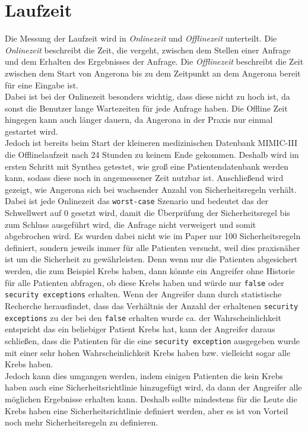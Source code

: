 \documentclass[german,version-2020-11]{uzl-thesis}
\begin{document}
\section{Laufzeit}
Die Messung der Laufzeit wird in \textit{Onlinezeit} und \textit{Offlinezeit} unterteilt. Die \textit{Onlinezeit} beschreibt die Zeit, die vergeht, zwischen dem Stellen einer Anfrage und dem Erhalten des Ergebnisses der Anfrage. Die \textit{Offlinezeit}  beschreibt die Zeit zwischen dem Start von Angerona bis zu dem Zeitpunkt an dem Angerona bereit für eine Eingabe ist. \\ 
Dabei ist bei der Onlinezeit besonders wichtig, dass diese nicht zu hoch ist, da sonst die Benutzer lange Wartezeiten  für jede Anfrage haben. Die Offline Zeit hingegen kann auch länger dauern, da Angerona in der Praxis nur einmal gestartet wird.  \\
Jedoch ist bereits beim Start der kleineren medizinischen Datenbank MIMIC-III die Offlinelaufzeit nach 24 Stunden zu keinem Ende gekommen. Deshalb wird im ersten Schritt mit Synthea getestet, wie groß eine Patientendatenbank werden kann, sodass diese noch in angemessener Zeit nutzbar ist.   
Anschließend wird gezeigt, wie Angerona sich bei wachsender Anzahl von Sicherheitsregeln verhält.\\ 
Dabei ist jede Onlinezeit das \texttt{worst-case} Szenario und bedeutet das der Schwellwert auf 0 gesetzt wird, damit die Überprüfung der Sicherheitsregel bis zum Schluss ausgeführt wird, die Anfrage nicht verweigert und somit abgebrochen wird. Es wurden dabei nicht wie im Paper nur 100 Sicherheitsregeln definiert, sondern jeweils immer für alle Patienten versucht, weil dies praxisnäher ist um die Sicherheit zu gewährleisten. Denn wenn nur die Patienten abgesichert werden, die zum Beispiel Krebs haben, dann könnte ein Angreifer ohne Historie für alle Patienten abfragen, ob diese Krebs haben und würde nur \texttt{false} oder \texttt{security exceptions} erhalten. Wenn der Angreifer dann durch statistische Recherche herausfindet, dass das Verhältnis der Anzahl der erhaltenen \texttt{security exceptions} zu der bei den \texttt{false} erhalten wurde ca. der Wahrscheinlichkeit entspricht das ein beliebiger Patient Krebs hat, kann der Angreifer daraus schließen, dass die Patienten für die eine \texttt{security exception} ausgegeben wurde mit einer sehr hohen Wahrscheinlichkeit Krebs haben bzw. vielleicht sogar alle Krebs haben. \\ 
Jedoch kann dies umgangen werden, indem einigen Patienten die kein Krebs haben auch eine Sicherheitsrichtlinie hinzugefügt wird, da dann der Angreifer alle möglichen Ergebnisse erhalten kann. Deshalb sollte mindestens für die Leute die Krebs haben eine Sicherheitsrichtlinie definiert werden, aber es ist von Vorteil noch mehr Sicherheitsregeln zu definieren.
\end{document}
